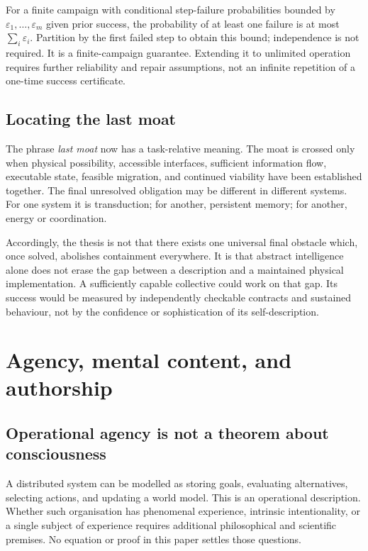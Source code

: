 \documentclass[11pt,a4paper]{article}
\theoremstyle{definition}
\theoremstyle{remark}
\begin{document}
For a finite campaign with conditional step-failure probabilities bounded by $\varepsilon_1,\ldots,\varepsilon_m$ given prior success, the probability of at least one failure is at most $\sum_i\varepsilon_i$. Partition by the first failed step to obtain this bound; independence is not required. It is a finite-campaign guarantee. Extending it to unlimited operation requires further reliability and repair assumptions, not an infinite repetition of a one-time success certificate.

\subsection{Locating the last moat}
The phrase \emph{last moat} now has a task-relative meaning. The moat is crossed only when physical possibility, accessible interfaces, sufficient information flow, executable state, feasible migration, and continued viability have been established together. The final unresolved obligation may be different in different systems. For one system it is transduction; for another, persistent memory; for another, energy or coordination.

Accordingly, the thesis is not that there exists one universal final obstacle which, once solved, abolishes containment everywhere. It is that abstract intelligence alone does not erase the gap between a description and a maintained physical implementation. A sufficiently capable collective could work on that gap. Its success would be measured by independently checkable contracts and sustained behaviour, not by the confidence or sophistication of its self-description.

\section{Agency, mental content, and authorship}\label{sec:intentionality}
\subsection{Operational agency is not a theorem about consciousness}
A distributed system can be modelled as storing goals, evaluating alternatives, selecting actions, and updating a world model. This is an operational description. Whether such organisation has phenomenal experience, intrinsic intentionality, or a single subject of experience requires additional philosophical and scientific premises. No equation or proof in this paper settles those questions.
\end{document}
